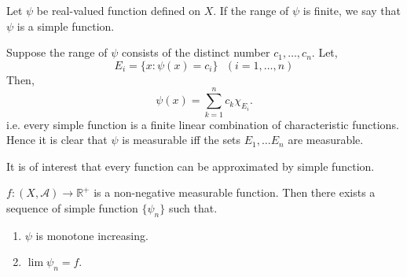 \begin{definition}
    Let $\psi$ be real-valued function defined on  $X$. If the range of  $\psi$ is finite, we say that  $\psi$ is a simple function.
\end{definition}
Suppose the range of $\psi$ consists of the distinct number  $c_1,\ldots,c_n$. Let,
\[
    E_i=\{x:\psi(x)=c_i\}\ \ \ (i=1,\ldots,n)
\]
Then,
\[
    \psi(x)=\sum_{k=1}^{n}c_k\chi_{E_{i}}.
\]
i.e. every simple function is a finite linear combination of characteristic functions. Hence it is clear that $\psi$ is measurable iff the sets  $E_1,\ldots E_n$
are measurable.

It is of interest that every function can be approximated by simple function.
\newpage
\begin{theorem}
    $f:(X,\mathcal{A})\to\mathds{R}^{+}$ is a non-negative measurable function. Then there exists a sequence of simple function $\{\psi_n\}$ such that.
     \begin{enumerate}
         \item $\psi$ is monotone increasing.
         \item  $\lim\psi_n=f$.
     \end{enumerate}
\end{theorem}
